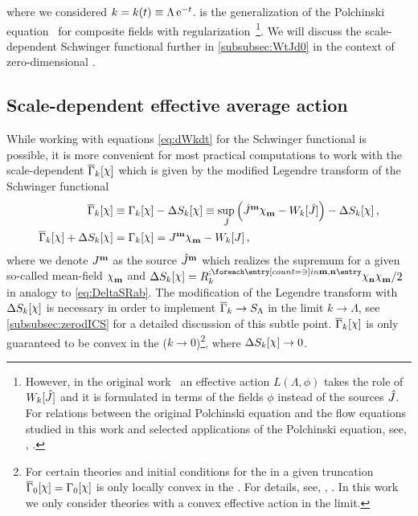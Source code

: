 where we considered $k=k(t)\equiv\Lambda\,\mathrm{e}^{-t}$.
 is the generalization of the Polchinski equation~\cite{Polchinski:1983gv} for composite fields with \ir{} regularization~\cite{PawlowskiScript}\footnote{%
	However, in the original work~\cite{Polchinski:1983gv} an effective action $L ( \Lambda, \phi )$ takes the role of $W_k[\hat{J}]$ and it is formulated in terms of the fields $\phi$ instead of the sources $\hat{J}$. For relations between the original Polchinski equation and the flow equations studied in this work and selected applications of the Polchinski equation, see, \eg{}, .
}.
We will discuss the scale-dependent Schwinger functional further in \cref{subsubsec:WtJd0} in the context of zero-dimensional \qfts{}.

\subsection{Scale-dependent effective average action}\label{subsec:frgeaa}
While working with \rg{} equations \eqref{eq:dWkdt} for the Schwinger functional is possible, it is more convenient for most practical computations to work with the scale-dependent \eaa{} $\FSeaa_k[\FSmf{\FSsf}]$  which is given by the modified Legendre transform of the Schwinger functional
\begin{align}
	\FSeaa_k[\FSmf{\FSsf}]&\equiv\FSea_k[\FSmf{\FSsf}] -\Delta S_k[\FSmf{\FSsf}] \equiv\sup_{\FSf{J}}\del{
	\FSfu{J}{m}\FSmfd{\FSsf}{m}-W_k[\FSf{J}]
	}-\Delta S_k[\FSmf{\FSsf}] \label{eq:Gammaksup}\, , \\
	\FSeaa_k[\FSmf{\FSsf}]+\Delta S_k[\FSmf{\FSsf}] &= \FSea_k[\FSmf{\FSsf}] = \FSmfu{J}{m}\FSmfd{\FSsf}{m}-W_k[\FSmf{J}]\, ,\label{eq:Gammak}
\end{align}
where we denote ${J}^{\textbf{m}}$ as the source $\hat{J}^{\textbf{m}}$ which realizes the supremum for a given so-called mean-field $\FSmfd{\FSsf}{m}$ and $\Delta S_k[\FSmf{\FSsf}]=\FSregulator{\FSidx{m},\FSidx{n}}\FSmfd{\FSsf}{n}\FSmfd{\FSsf}{m}/2$ in analogy to \cref{eq:DeltaSRab}.
The modification of the Legendre transform with $\Delta S_k[\FSmf{\FSsf}]$ is necessary in order to implement $\overline{\Gamma}_k\rightarrow S_\Lambda$ in the \uv{} limit $k\rightarrow \Lambda$, see \cref{subsubsec:zerodICS} for a detailed discussion of this subtle point. 
$\FSeaa_k[\FSmf{\FSsf}]$ is only guaranteed to be convex in the \ir{} ($k\rightarrow 0$)\footnote{%
	For certain theories and initial conditions for the \rgscaleevolution{} in a given truncation $\FSeaa_0[\FSmf{\FSsf}]=\FSea_0[\FSmf{\FSsf}]$ is only locally convex in the \ir{}. For details, see, \eg{}, . In this work we only consider theories with a convex effective action in the \ir{} limit.%
}, where $\Delta S_k[\FSmf{\FSsf}]\rightarrow 0$.
